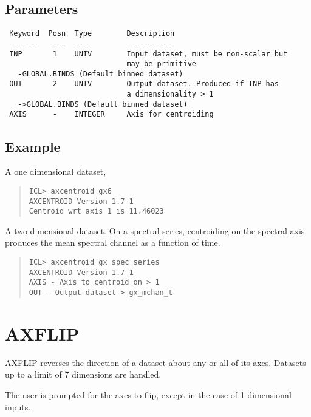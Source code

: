 \documentclass{book}
\renewcommand{\_}{{\tt\char'137}}     %
\begin{document}
\subsection{Parameters}
\begin{verbatim}
 Keyword  Posn  Type        Description
 -------  ----  ----        -----------
 INP       1    UNIV        Input dataset, must be non-scalar but
                            may be primitive
   -GLOBAL.BINDS (Default binned dataset)
 OUT       2    UNIV        Output dataset. Produced if INP has
                            a dimensionality > 1
   ->GLOBAL.BINDS (Default binned dataset)
 AXIS      -    INTEGER     Axis for centroiding

\end{verbatim}\subsection{Example}
A one dimensional dataset,

\begin{quote}\begin{verbatim}
ICL> axcentroid gx6
AXCENTROID Version 1.7-1
Centroid wrt axis 1 is 11.46023
\end{verbatim}\end{quote}
A two dimensional dataset. On a spectral series, centroiding on the
spectral axis produces the mean spectral channel as a function of
time.

\begin{quote}\begin{verbatim}
ICL> axcentroid gx_spec_series
AXCENTROID Version 1.7-1
AXIS - Axis to centroid on > 1
OUT - Output dataset > gx_mchan_t
\end{verbatim}\end{quote}
\section{AXFLIP}
AXFLIP reverses the direction of a dataset about any or all of its
axes. Datasets up to a limit of 7 dimensions are handled.

The user is prompted for the axes to flip, except in the case of
1 dimensional inputs.
\end{document}
